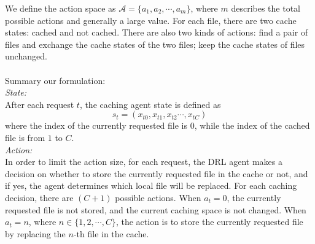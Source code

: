 \documentclass[a4paper,12pt]{article}
\begin{document}
 We define the action space as $\mathcal{A}=\{a_1,a_2,\cdots,a_m\}$, where $m$ describes the total possible actions and generally a large value. For each file, there are two cache states: cached and not cached. There are also two kinds of actions: find a pair of files and exchange the cache states of the two files; keep the cache states of files unchanged.\\~\\
 Summary our formulation:\\
\emph{State:}\\
After each request $t$, the caching agent state is defined as
$$s_t=\left(x_{t0},x_{t1},x_{t2}\cdots,x_{tC}\right)$$
where the index of the currently requested file is $0$, while the index of the cached file is from $1$ to $C$.\\
\emph{Action:}\\
In order to limit the action size, for each request, the DRL agent makes a decision on whether to store the currently requested file in the cache or not, and if yes, the agent determines which local file will be replaced. For each caching decision, there are $(C+1)$ possible actions. When $a_t=0$, the currently requested file is not stored, and the current caching space is not changed. When $a_t=n$, where $n\in\{1,2,\cdots,C\}$, the action is to store the currently requested file by replacing the $n$-th file in the cache.
\end{document}
